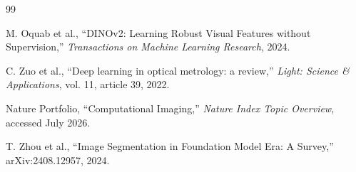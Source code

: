 \documentclass[12pt,openany,oneside]{book}
\begin{document}
\begin{thebibliography}{99}
\begin{LTR}
M. Oquab et al.,
``DINOv2: Learning Robust Visual Features without Supervision,''
\emph{Transactions on Machine Learning Research}, 2024.

C. Zuo et al.,
``Deep learning in optical metrology: a review,''
\emph{Light: Science \& Applications}, vol. 11, article 39, 2022.

Nature Portfolio,
``Computational Imaging,''
\emph{Nature Index Topic Overview}, accessed July 2026.

T. Zhou et al.,
``Image Segmentation in Foundation Model Era: A Survey,''
arXiv:2408.12957, 2024.

\end{LTR}
\end{thebibliography}
\end{document}

